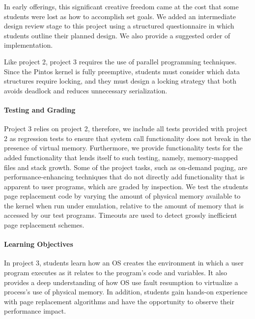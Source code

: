 In early offerings, this significant creative freedom came at the cost that 
some students were lost as how to accomplish set goals.  We added an intermediate
design review stage to this project using a structured questionnaire in which students 
outline their planned design.  We also provide a suggested order of implementation.

Like project 2, project 3 requires the use of parallel programming techniques.  
Since the Pintos kernel is fully preemptive, students must consider which data structures
require locking, and they must design a locking strategy that both avoids deadlock
and reduces unnecessary serialization.

\paragraph{Testing and Grading}
Project 3 relies on project 2, therefore, we include all tests provided with project 2
as regression tests to ensure that system call functionality does not break in the
presence of virtual memory.  Furthermore, we provide functionality tests for the
added functionality that lends itself to such testing, namely, memory-mapped files
and stack growth.  Some of the project tasks, such as on-demand paging, are 
performance-enhancing techniques that do not directly add functionality that is
apparent to user programs, which are graded by inspection.  We test the students
page replacement code by varying the amount of physical memory available to
the kernel when run under emulation, relative to the amount of memory that is 
accessed by our test programs.  Timeouts are used to detect grossly inefficient 
page replacement schemes.

\paragraph{Learning Objectives}
In project 3, students learn how an OS creates the environment in which a user
program executes as it relates to the program's code and variables.
It also provides a deep understanding of how OS use fault resumption
to virtualize a process's use of physical memory.
In addition, students gain hands-on experience with page replacement algorithms
and have the opportunity to observe their performance impact.

%
%
%
